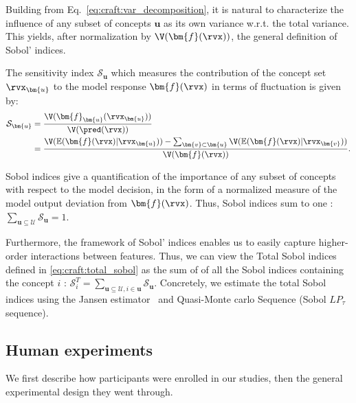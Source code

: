 Building from Eq.~\ref{eq:craft:var_decomposition}, it is natural to characterize the influence of any subset of concepts $\bm{u}$ as its own variance w.r.t. the total variance. This yields, after normalization by $\V(\bm{f}(\rvx))$, the general definition of Sobol' indices.
\begin{definition}
The sensitivity index $\mathcal{S}_{\bm{u}}$ which measures the contribution of the concept set $\rvx_{\bm{u}}$ to the model response $\bm{f}(\rvx)$ in terms of fluctuation is given by:
\begin{equation}\label{eq:craft:sobol_indice}
\begin{aligned}
    \mathcal{S}_{\bm{u}}  &= \frac{ \V(\bm{f}_{\bm{u}}(\rvx_{\bm{u}})) }{ \V(\pred(\rvx)) }\\
    &= \frac{ \V(\mathbb{E}(\bm{f}(\rvx) | \rvx_{\bm{u}})) - \sum_{\bm{v}\subset \bm{u}}\V(\mathbb{E}(\bm{f}(\rvx) | \rvx_{\bm{v}} ))}{ \V(\bm{f}(\rvx)) }.
\end{aligned}
\end{equation}
\end{definition}

Sobol indices give a quantification of the importance of any subset of concepts with respect to the model decision, in the form of a normalized measure of the model output deviation from $\bm{f}(\rvx)$. Thus, Sobol indices sum to one : $\sum_{\bm{u} \subseteq \mathcal{U}} \mathcal{S}_{\bm{u}} = 1$. 

\vspace{2mm}
Furthermore, the framework of Sobol' indices enables us to easily capture higher-order interactions between features. Thus, we can view the Total Sobol indices defined in \ref{eq:craft:total_sobol} as the sum of of all the Sobol indices containing the concept $i$ : $\mathcal{S}^{T}_i = \sum_{\bm{u} \subseteq \mathcal{U}, i \in \bm{u}} \mathcal{S}_{\bm{u}}$. Concretely, we estimate the total Sobol indices using the Jansen estimator~\cite{janon2014asymptotic} and Quasi-Monte carlo Sequence (Sobol $LP_{\tau}$ sequence).

\clearpage

\subsection{Human experiments}\label{app:craft:human-exp}

We first describe how participants were enrolled in our studies, then the general experimental design they went through.


